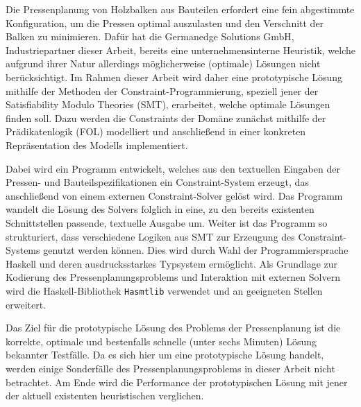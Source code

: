 \abstract
\label{sec:Abstrakt}

Die Pressenplanung von Holzbalken aus Bauteilen erfordert eine fein abgestimmte Konfiguration, um die Pressen optimal auszulasten und den Verschnitt der Balken zu minimieren.
Dafür hat die Germanedge Solutions GmbH, Industriepartner dieser Arbeit, bereits eine unternehmensinterne Heuristik, welche aufgrund ihrer Natur allerdings möglicherweise (optimale) Lösungen nicht berücksichtigt.
Im Rahmen dieser Arbeit wird daher eine prototypische Lösung mithilfe der Methoden der Constraint-Programmierung, speziell jener der Satisfiability Modulo Theories (SMT), erarbeitet, welche optimale Lösungen finden soll.
Dazu werden die Constraints der Domäne zunächst mithilfe der Prädikatenlogik (FOL) modelliert und anschließend in einer konkreten Repräsentation des Modells implementiert.

Dabei wird ein Programm entwickelt, welches aus den textuellen Eingaben der Pressen- und Bauteilspezifikationen ein Constraint-System erzeugt, das anschließend von einem externen Constraint-Solver gelöst wird.
Das Programm wandelt die Lösung des Solvers folglich in eine, zu den bereits existenten Schnittstellen passende, textuelle Ausgabe um.
Weiter ist das Programm so strukturiert, dass verschiedene Logiken aus SMT zur Erzeugung des Constraint-Systems genutzt werden können.
Dies wird durch Wahl der Programmiersprache Haskell und deren ausdrucksstarkes Typsystem ermöglicht.
Als Grundlage zur Kodierung des Pressenplanungsproblems und Interaktion mit externen Solvern
wird die Haskell-Bibliothek \texttt{Hasmtlib} \cite{bruder} verwendet und an geeigneten Stellen erweitert.

Das Ziel für die prototypische Lösung des Problems der Pressenplanung ist die korrekte, optimale und bestenfalls schnelle (unter sechs Minuten) Lösung bekannter Testfälle.
Da es sich hier um eine prototypische Lösung handelt, werden einige Sonderfälle des Pressenplanungsproblems in dieser Arbeit nicht betrachtet.
Am Ende wird die Performance der prototypischen Lösung mit jener der aktuell existenten heuristischen verglichen.
